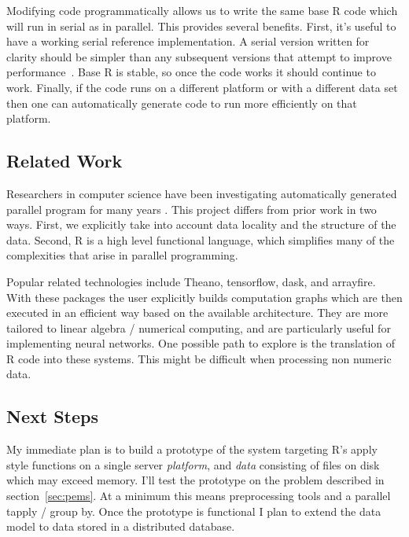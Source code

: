 \documentclass[12pt]{article}
\begin{document}
Modifying code programmatically allows us to write the same base R code
which will run in serial as in parallel. This provides several benefits.
First, it's useful to have a working serial reference implementation.  A
serial version written for clarity should be simpler than any subsequent
versions that attempt to improve performance~\cite{matloff2015parallel}.
Base R is stable, so once the code works it should continue to work.
Finally, if the code runs on a different platform or with a different data
set then one can automatically generate code to run more efficiently on
that platform.

\subsection{Related Work}

Researchers in computer science have been investigating automatically
generated parallel program for many years \cite{girkar1992automatic}
\cite{sarkar1991automatic} \cite{adve2004parallel}. This project differs
from prior work in two ways. First, we explicitly take into account
data locality and the structure of the data. Second, R is a high level functional
language, which simplifies many of the complexities that arise in parallel
programming.

Popular related technologies include Theano, tensorflow, dask, and
arrayfire. With these packages the user explicitly builds computation
graphs which are then executed in an efficient way based on the available
architecture. They are more tailored to linear algebra / numerical
computing, and are particularly useful for implementing neural networks.
One possible path to explore is the translation of R code into these
systems. This might be difficult when processing non numeric data.

\subsection{Next Steps}

My immediate plan is to build a prototype of the system targeting R's apply
style functions on a single server \emph{platform}, and \emph{data}
consisting of files on disk which may exceed memory. I'll test the
prototype on the problem described in section~\ref{sec:pems}. At a minimum
this means preprocessing tools and a parallel tapply / group by.  Once the
prototype is functional I plan to extend the data model to data stored
in a distributed database.


 
\end{document}
